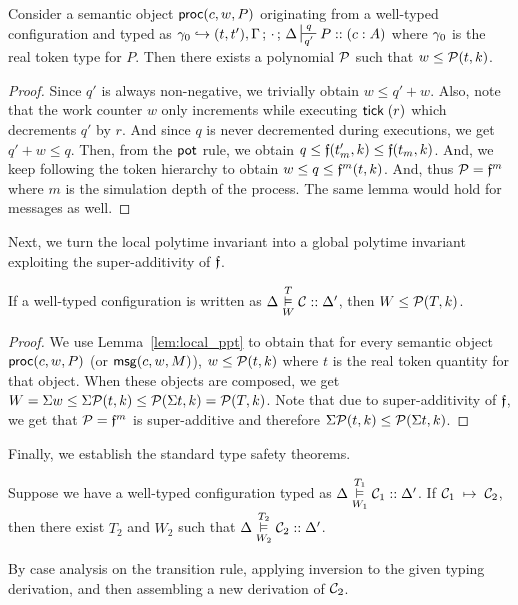\begin{lemma}\label{lem:local_ppt}
  Consider a semantic object $\mathsf{proc}(c, w, P)$ originating from a well-typed configuration and
  typed as $\K_0 \hookrightarrow (t, t'), \Tokens \semi \cdot \semi \D \entailpot{q}{q'} P :: (c : A)$
  where $\gamma_0$ is the real token type for $P$.
  Then there exists a polynomial $\mathcal{P}$ such that $w \leq \mathcal{P}(t, k)$.
\end{lemma}

\begin{proof}
  Since $q'$ is always non-negative, we trivially obtain $w \leq q'+w$.
  Also, note that the work counter $w$ only increments while executing $\mathsf{tick} \; (r)$
  which decrements $q'$ by $r$.
  And since $q$ is never decremented during executions, we get $q'+w \leq q$.
  Then, from the $\mathsf{pot}$ rule, we obtain $q \leq \mathfrak{f}(t_m', k) \leq \mathfrak{f}(t_m, k)$.
  And, we keep following the token hierarchy to obtain
  $w \leq q \leq \mathfrak{f}^{m}(t, k)$.
  And, thus $\mathcal{P} = \mathfrak{f}^{m}$ where $m$ is the simulation depth of the process.
  The same lemma would hold for messages as well.
\end{proof}

Next, we turn the local polytime invariant into a global polytime invariant exploiting
the super-additivity of $\mathfrak{f}$.

\begin{theorem} \label{thm:global_ppt}
  If a well-typed configuration is written as $\Delta \overset{T}{\underset{W}{\vDash}} \mathcal{C} :: \Delta'$,
  then $W \leq \mathcal{P}(T, k)$.
\end{theorem}

\begin{proof}
  We use Lemma~\ref{lem:local_ppt} to obtain that for every semantic object $\mathsf{proc}(c, w, P)$ (or $\mathsf{msg}(c, w, M)$),
  $w \leq \mathcal{P}(t, k)$ where $t$ is the real token quantity for that object.
  When these objects are composed, we get $W = \Sigma w \leq \Sigma \mathcal{P}(t, k) \leq
  \mathcal{P}(\Sigma t, k) = \mathcal{P}(T, k)$.
  Note that due to super-additivity of $\mathfrak{f}$, we get that $\mathcal{P} = \mathfrak{f}^m$ is super-additive
  and therefore $\Sigma \mathcal{P}(t, k) \leq \mathcal{P}(\Sigma t, k)$.
\end{proof}

Finally, we establish the standard type safety theorems.

\begin{theorem}
\label{thm:preservation}
Suppose we have a well-typed configuration typed as
$\Delta \overset{T_1}{\underset{W_1}{\vDash}} \mathcal{C}_1 :: \Delta'$.
If $\mathcal{C}_1 \; \mapsto \; \mathcal{C}_2$, then there exist $T_2$ and $W_2$ such
that $\Delta \overset{T_2}{\underset{W_2}{\vDash}} \mathcal{C}_2 :: \Delta'$.
\end{theorem}
\begin{proofsketch}
  By case analysis on the transition rule, applying inversion to the
  given typing derivation, and then assembling a new derivation of
  $\mathcal{C}_2$.
\end{proofsketch}

